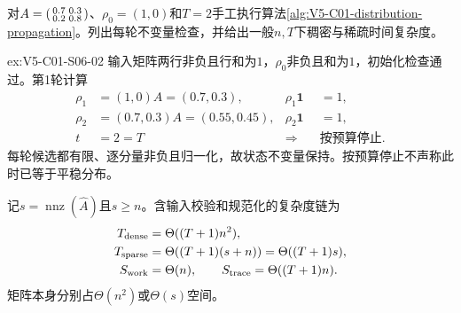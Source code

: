 \begin{SLChapterExercisePairSection}
\begin{exercise}\label{ex:V5-C01-S06-02}
对$A=\begin{psmallmatrix}0.7&0.3\\0.2&0.8\end{psmallmatrix}$、$\rho_0=(1,0)$和$T=2$手工执行算法\ref{alg:V5-C01-distribution-propagation}。列出每轮不变量检查，并给出一般$n,T$下稠密与稀疏时间复杂度。
\end{exercise}
\ifSLFullEdition
{}\label{sol:V5-C01-S06-02}
\begin{chapterexercisesolution}{ex:V5-C01-S06-02}
输入矩阵两行非负且行和为$1$，$\rho_0$非负且和为$1$，初始化检查通过。第1轮计算
\[
\begin{aligned}
\rho_1&=(1,0)A=(0.7,0.3),&\rho_1\boldsymbol1&=1,\\
\rho_2&=(0.7,0.3)A=(0.55,0.45),&\rho_2\boldsymbol1&=1,\\
t&=2=T&\Longrightarrow\quad&\text{按预算停止}.
\end{aligned}
\]
每轮候选都有限、逐分量非负且归一化，故状态不变量保持。按预算停止不声称此时已等于平稳分布。

记$s=\operatorname{nnz}(\widehat A)$且$s\ge n$。含输入校验和规范化的复杂度链为
\[
\begin{aligned}
T_{\rm dense}&=\Theta((T+1)n^2),\\
T_{\rm sparse}&=\Theta((T+1)(s+n))=\Theta((T+1)s),\\
S_{\rm work}&=\Theta(n),\qquad S_{\rm trace}=\Theta((T+1)n).
\end{aligned}
\]
矩阵本身分别占$\Theta(n^2)$或$\Theta(s)$空间。
\end{chapterexercisesolution}
\fi

\end{SLChapterExercisePairSection}

